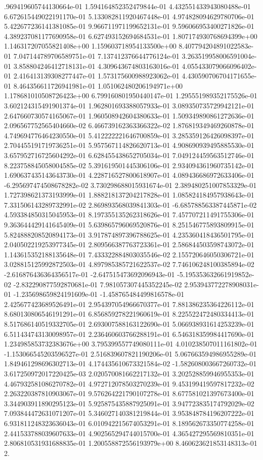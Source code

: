 .969419605744130664e-01	1.594164852352479844e-01	4.432551433943080488e-01	6.672615449022191170e-01	5.133082811920467448e-01	4.974828094629780706e-01	5.422677236141381085e-01	9.966711971199652131e-01	9.596066953400271826e-01	4.389237081177690958e-01	6.627493152694684531e-01	1.807174930768694399e+00	1.146317207055821408e+00	1.159603718954133500e+00	8.407794204891022583e-01	7.047144789706589751e-01	7.137412376644776124e-01	3.263519958006591004e-01	3.858804246412718131e-01	4.309643674803163016e-01	4.055433079066096402e-01	2.416413139308277447e-01	1.573175600988923062e-01	4.430590706704171655e-01	8.464356611726941981e-01	1.051062480206194971e+00	1.178681010508726423e+00	6.799160801950440147e-01	1.295551989352175526e-01	3.602124315491901374e-01	1.962801693388057933e-01	3.089350735729942121e-01	2.647660730574165067e-01	1.960508942604380633e-01	1.509349890861272636e-01	2.096567752565404660e-02	6.466739162363366322e-02	1.876819349469260878e-01	4.749694776464230550e-01	5.412222221646700859e-01	3.285359126426098397e-01	2.704455191719736251e-01	5.957567114826620713e-01	4.908690939495885530e-01	3.657952716725604292e-01	6.628455438652705034e-01	7.049124459563512746e-01	8.223758845058004585e-02	5.391619501445306106e-01	2.934094361960735142e-01	1.690637435143643730e-01	4.228716527800618907e-01	4.089436686972633406e-01	-6.295697474508678282e-02	3.730298688015931674e-01	2.389480251007853329e-01	1.727398621373193999e-01	1.888218137204217828e-01	1.085824184957938643e-01	7.331506143289732991e-02	2.869893568039841303e-01	-6.685788563387445871e-02	4.593384850315045953e-01	8.197355135262318626e-01	7.457707211491755306e-01	9.363644429141645409e-01	5.639865796069520876e-01	8.251546775893809915e-01	5.824888208520894173e-01	3.917874897396788625e-01	4.235360418436501795e-01	2.040502219253977345e-01	2.809566387763723361e-01	2.586844503598743072e-01	1.143615352188135648e-01	7.433322884803035546e-02	2.155720646050306721e-01	3.028815125992872503e-01	4.897985385721622537e-02	7.746106248100385894e-02	-2.616876436364356517e-01	-2.647515473692096943e-01	-5.195353632661919852e-02	-2.832290877592870681e-01	7.981057307445352245e-02	2.953943772278908031e-01	-1.235698659824191609e-01	-1.458765484499816578e-01	2.425677423689526491e-01	2.954397054966670377e-01	7.881386235364226112e-01	8.680130806546191291e-01	6.856859278221960619e-01	8.225522472480334413e-01	8.517686140519332705e-01	2.693007588163122690e-01	5.066938931614253239e-01	6.511434743130098957e-01	2.236460603766288191e-01	6.546318359984417690e-01	1.234985853732383676e+00	3.795399557749080111e-01	4.010238507011161802e-01	-1.153066545203596527e-01	2.516839607821190206e-01	5.067663594986955289e-01	1.849461298696302713e-01	4.174435610673321584e-02	-1.582608003667260732e-01	3.617250972017220425e-03	2.020570081662217132e-01	3.202528859946955353e-01	4.467932581086270782e-01	4.972712078503270239e-01	9.453199419597817232e-02	2.263220387810903067e-01	9.576264221790107278e-01	8.677581021397673400e-01	3.344903911890295123e-01	5.925875435887925091e-01	3.947723835174792029e-02	7.093844472631071207e-01	5.346027140381219844e-01	3.953848784196207222e-01	6.931811248323636043e-01	6.010942215674053291e-01	8.189562673350774258e-01	2.441533788039607633e-01	4.902565294744015700e-01	4.365427295569810351e-01	2.806810531931688835e-01	1.200558872556193979e+00	8.460623621853148313e-01	2.